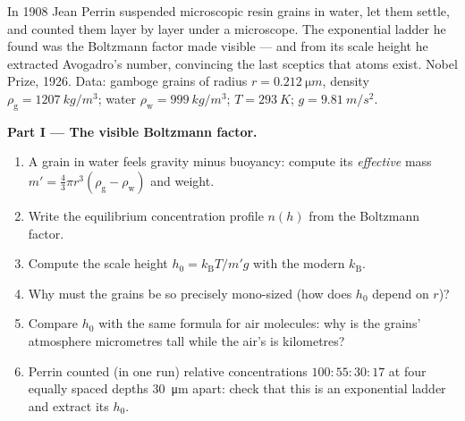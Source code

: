 \begin{problem}\label{pb:b3:canonical-ensemble:1}
In 1908 Jean Perrin suspended microscopic resin grains in water,
let them settle, and counted them layer by layer under a
microscope. The exponential ladder he found was the Boltzmann
factor made visible --- and from its scale height he extracted
Avogadro's number, convincing the last sceptics that atoms exist.
Nobel Prize, 1926. Data: gamboge grains of radius $r =
\qty{0.212}{\micro m}$, density $\rho_{\text{g}} =
\qty{1207}{kg/m^3}$; water $\rho_{\text{w}} = \qty{999}{kg/m^3}$;
$T = \qty{293}{K}$; $g = \qty{9.81}{m/s^2}$.

\medskip\noindent\textbf{Part I --- The visible Boltzmann factor.}
\begin{enumerate}
  \item A grain in water feels gravity minus buoyancy: compute its
        \emph{effective} mass $m' = \tfrac43\pi r^3(\rho_{\text{g}}
        - \rho_{\text{w}})$ and weight.
  \item Write the equilibrium concentration profile $n(h)$ from
        the Boltzmann factor.
  \item Compute the scale height $h_0 = k_{\text{B}}T/m'g$ with
        the modern $k_{\text{B}}$.
  \item Why must the grains be so precisely mono-sized (how does
        $h_0$ depend on $r$)?
  \item Compare $h_0$ with the same formula for air molecules:
        why is the grains' atmosphere micrometres tall while the
        air's is kilometres?
  \item Perrin counted (in one run) relative concentrations
        $100 : 55 : 30 : 17$ at four equally spaced depths
        \qty{30}{\micro m} apart: check that this is an
        exponential ladder and extract its $h_0$.
\end{enumerate}


\end{problem}
